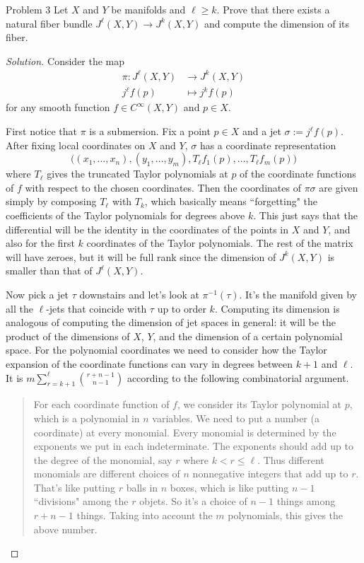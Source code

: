 \begin{thing1}{Problem 3}\label{prob:3}\leavevmode
Let \(X\) and \(Y\) be manifolds and \(\ell \geq  k\). Prove that there exists a natural fiber bundle \(J^\ell(X,Y) \to J^k(X,Y)\) and compute the dimension of its fiber.
\end{thing1}

\begin{proof}[Solution]\leavevmode
Consider the map
\begin{align*}
	\pi: J^\ell(X,Y) &\longrightarrow J^{k}(X,Y) \\
	j^\ell f(p) &\longmapsto j^k f(p)
\end{align*}
for any smooth function \(f \in C^\infty(X,Y)\) and \(p \in X\).

First notice that \(\pi\) is a submersion. Fix a point \(p \in X\) and a jet \(\sigma:= j^\ell f(p)\). After fixing local coordinates on \(X\) and \(Y\), \(\sigma\) has a coordinate representation 
\[\Big((x_1,\ldots,x_n), (y_1,\ldots,y_m),T_\ell f_1(p),\ldots,T_\ell f_m(p)\Big)\]
where \(T_\ell\) gives the truncated Taylor polynomials at \(p\) of the coordinate functions of \(f\) with respect to the chosen coordinates. Then the coordinates of \(\pi\sigma\) are given simply by composing \(T_\ell\) with \(T_k\), which basically means ``forgetting" the coefficients of the Taylor polynomials for degrees above \(k\). This just says that the differential will be the identity in the coordinates of the points in \(X\) and \(Y\), and also for the first \(k\) coordinates of the Taylor polynomials. The rest of the matrix will have zeroes, but it will be full rank since the dimension of \(J^k(X,Y)\) is smaller than that of  \(J^\ell(X,Y)\).

Now pick a jet \(\tau\) downstairs and let's look at \(\pi^{-1}(\tau)\). It's the manifold given by all the \(\ell\)-jets that coincide with \(\tau\) up to order \(k\). Computing its dimension is analogous of computing the dimension of jet spaces in general: it will be the product of the dimensions of \(X\), \(Y\), and the dimension of a certain polynomial space. For the polynomial coordinates we need to consider how the Taylor expansion of the coordinate functions can vary in degrees between  \(k+1\) and \(\ell\). It is \(m \sum_{r=k+1}^\ell \binom{r+n-1}{n-1}\) according to the following combinatorial argument.

\begin{quotation}
For each coordinate function of \(f\), we consider its Taylor polynomial at \(p\), which is a polynomial in  \(n\) variables. We need to put a number (a coordinate) at every monomial. Every monomial is determined by the exponents we put in each indeterminate. The exponents should add up to the degree of the monomial, say \(r\) where \(k<r\leq \ell\). Thus different monomials are different choices of \(n\) nonnegative integers that add up to \(r\). That's like putting \(r\) balls in \(n\) boxes, which is like putting \(n-1\) ``divisions" among the \(r\) objets. So it's a choice of \(n-1\) things among \(r+n-1\) things. Taking into account the \(m\) polynomials, this gives the above number.
\end{quotation}


\end{proof}
